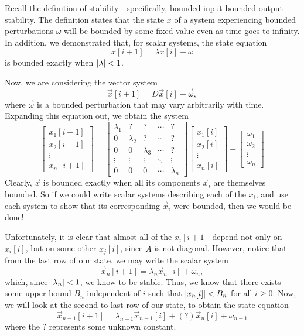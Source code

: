\documentclass[letterpaper]{article}
\theoremstyle{remark}
\renewcommand{\tilde}[1]{\widetilde{#1}}
\newcommand{\mat}[1]{\ensuremath{\begin{bmatrix}#1\end{bmatrix}}}
\begin{document}
Recall the definition of stability - specifically, bounded-input bounded-output stability. The definition states that the state $x$ of a system experiencing bounded perturbations $\omega$ will be bounded by some fixed value even as time goes to infinity. In addition, we demonstrated that, for scalar systems, the state equation
\[
    x[i + 1] = \lambda x[i] + \omega
\]
is bounded exactly when $\abs{\lambda} < 1$.

Now, we are considering the vector system
\[
    \vec{x}[i + 1] = D\vec{x}[i] + \vec{\omega},
\]
where $\vec{\omega}$ is a bounded perturbation that may vary arbitrarily with time. Expanding this equation out, we obtain the system
\[
    \mat{x_1[i+1] \\ x_2[i+1] \\ \vdots \\ x_n[i+1]} = \mat{
    \lambda_1 & ? & ? & \cdots & ? \\ 
    0 & \lambda_2 & ? & \cdots & ? \\
    0 & 0 & \lambda_3 & \cdots & ? \\
    \vdots & \vdots & \vdots & \ddots & \vdots \\
    0 & 0 & 0 & \cdots & \lambda_n} \mat{x_1[i] \\ x_2[i] \\ \vdots \\ x_n[i]} + \mat{\omega_1 \\ \omega_2 \\ \vdots \\ \omega_n}
\]
Clearly, $\vec{x}$ is bounded exactly when all its components $\vec{x}_i$ are themselves bounded. So if we could write scalar systems describing each of the $x_i$, and use each system to show that its corresponding $\vec{x}_i$ were bounded, then we would be done!

Unfortunately, it is clear that almost all of the $x_i[i + 1]$ depend not only on $x_i[i]$, but on some other $x_j[i]$, since $\tilde{A}$ is not diagonal. However, notice that from the last row of our state, we may write the scalar system
\[
    \vec{x}_n[i + 1] = \lambda_n \vec{x}_n[i] + \omega_n,
\]
which, since $\abs{\lambda_n} < 1$, we know to be stable. Thus, we know that there exists some upper bound $B_n$ independent of $i$ such that $\abs{x_n[i]} < B_n$ for all $i \ge 0$. Now, we will look at the second-to-last row of our state, to obtain the state equation
\[
    \vec{x}_{n-1}[i+1] = \lambda_{n-1}\vec{x}_{n-1}[i] + (?)\vec{x}_n[i] + \omega_{n-1}
\]
where the $?$ represents some unknown constant. 
\end{document}
